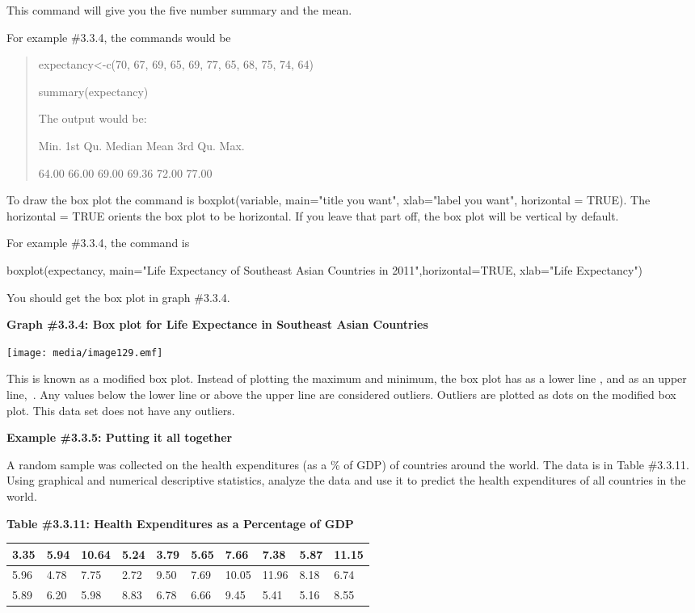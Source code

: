 \documentclass[]{book}
\begin{document}
This command will give you the five number summary and the mean.

For example \#3.3.4, the commands would be

\begin{quote}
expectancy\textless{}-c(70, 67, 69, 65, 69, 77, 65, 68, 75, 74, 64)

summary(expectancy)

The output would be:

Min. 1st Qu. Median Mean 3rd Qu. Max.

64.00 66.00 69.00 69.36 72.00 77.00
\end{quote}

To draw the box plot the command is boxplot(variable, main="title you
want", xlab="label you want", horizontal = TRUE). The horizontal =
TRUE orients the box plot to be horizontal. If you leave that part off,
the box plot will be vertical by default.~

For example \#3.3.4, the command is~

boxplot(expectancy, main="Life Expectancy of Southeast Asian Countries
in 2011",horizontal=TRUE, xlab="Life Expectancy")

You should get the box plot in graph \#3.3.4.

\textbf{Graph \#3.3.4: Box plot for Life Expectance in Southeast Asian
Countries}

\texttt{[image: media/image129.emf]}

This is known as a modified box plot. Instead of plotting the maximum
and minimum, the box plot has as a lower line , and as an upper line,~.
Any values below the lower line or above the upper line are considered
outliers. Outliers are plotted as dots on the modified box plot. This
data set does not have any outliers.

\textbf{Example \#3.3.5: Putting it all together}

A random sample was collected on the health expenditures (as a \% of GDP)
of countries around the world. The data is in Table \#3.3.11. Using
graphical and numerical descriptive statistics, analyze the data and use
it to predict the health expenditures of all countries in the world.

\textbf{Table \#3.3.11: Health Expenditures as a Percentage of GDP}

\begin{longtable}[]{@{}llllllllll@{}}
\toprule
3.35 & 5.94 & 10.64 & 5.24 & 3.79 & 5.65 & 7.66 & 7.38 & 5.87 & 11.15\tabularnewline
\midrule
\endhead
5.96 & 4.78 & 7.75 & 2.72 & 9.50 & 7.69 & 10.05 & 11.96 & 8.18 & 6.74\tabularnewline
5.89 & 6.20 & 5.98 & 8.83 & 6.78 & 6.66 & 9.45 & 5.41 & 5.16 & 8.55\tabularnewline
\bottomrule
\end{longtable}
\end{document}
